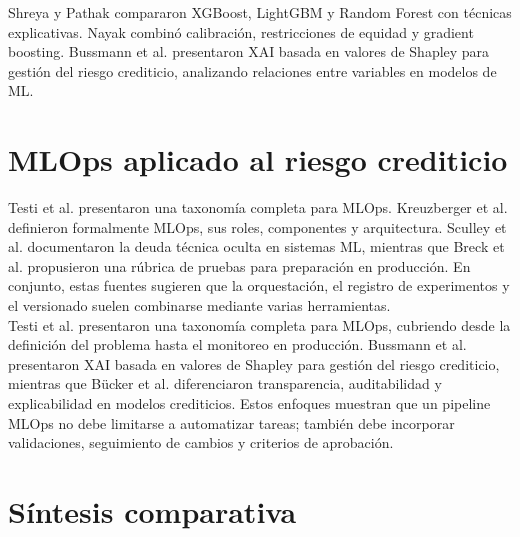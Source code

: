 Shreya y Pathak \cite{bussmann2021explainable} compararon XGBoost, LightGBM y Random Forest con técnicas explicativas. Nayak \cite{bucker2022transparency} combinó calibración, restricciones de equidad y gradient boosting. Bussmann et al. \cite{bussmann2021explainable} presentaron XAI basada en valores de Shapley para gestión del riesgo crediticio, analizando relaciones entre variables en modelos de ML.

\section{MLOps aplicado al riesgo crediticio}

Testi et al. \cite{testi2022mlops} presentaron una taxonomía completa para MLOps. Kreuzberger et al. \cite{kreuzberger2023machine} definieron formalmente MLOps, sus roles, componentes y arquitectura. Sculley et al. \cite{sculley2015hidden} documentaron la deuda técnica oculta en sistemas ML, mientras que Breck et al. \cite{breck2017ml} propusieron una rúbrica de pruebas para preparación en producción. En conjunto, estas fuentes sugieren que la orquestación, el registro de experimentos y el versionado suelen combinarse mediante varias herramientas.\\

Testi et al. \cite{testi2022mlops} presentaron una taxonomía completa para MLOps, cubriendo desde la definición del problema hasta el monitoreo en producción. Bussmann et al. \cite{bussmann2021explainable} presentaron XAI basada en valores de Shapley para gestión del riesgo crediticio, mientras que Bücker et al. \cite{bucker2022transparency} diferenciaron transparencia, auditabilidad y explicabilidad en modelos crediticios. Estos enfoques muestran que un pipeline MLOps no debe limitarse a automatizar tareas; también debe incorporar validaciones, seguimiento de cambios y criterios de aprobación.

\section{Síntesis comparativa}

